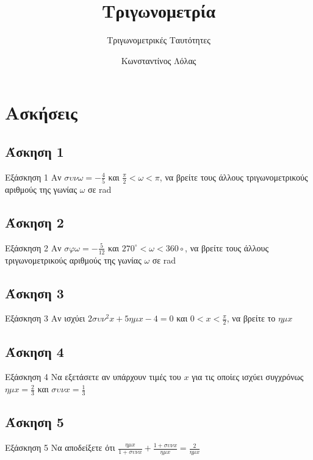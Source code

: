 \documentclass[greek]{beamer}
\title{Τριγωνομετρία}
\subtitle{Τριγωνομετρικές Ταυτότητες}
\author[Λόλας]{Κωνσταντίνος Λόλας}
\date{}
\begin{document}
\begin{frame}
 \titlepage
\end{frame}

\section{Ασκήσεις}
\subsection{Άσκηση 1}
\begin{frame}[label=Άσκηση1]{Εξάσκηση 1}
Αν $συνω=-\frac{4}{5}$ και $\frac{π}{2}<ω<π$, να βρείτε τους άλλους τριγωνομετρικούς αριθμούς της γωνίας $ω$ σε rad

\end{frame}

\subsection{Άσκηση 2}
\begin{frame}[label=Άσκηση2]{Εξάσκηση 2}
Αν $σφω=-\frac{5}{12}$ και $270^{\circ}<ω<360{\circ}$, να βρείτε τους άλλους τριγωνομετρικούς αριθμούς της γωνίας $ω$ σε rad

\end{frame}

\subsection{Άσκηση 3}
\begin{frame}[label=Άσκηση3]{Εξάσκηση 3}
Αν ισχύει $2συν^2x+5ημx-4=0$ και $0<x<\frac{π}{2}$, να βρείτε το $ημx$

\end{frame}

\subsection{Άσκηση 4}
\begin{frame}[label=Άσκηση4]{Εξάσκηση 4}
Να εξετάσετε αν υπάρχουν τιμές του $x$ για τις οποίες ισχύει συγχρόνως $ημx=\frac{2}{3}$ και $συνx=\frac{1}{3}$
\end{frame}

\subsection{Άσκηση 5}
\begin{frame}[label=Άσκηση5]{Εξάσκηση 5}
Να αποδείξετε ότι $\frac{ημx}{1+συνx}+\frac{1+συνx}{ημx}=\frac{2}{ημx}$

\end{frame}
\end{document}
